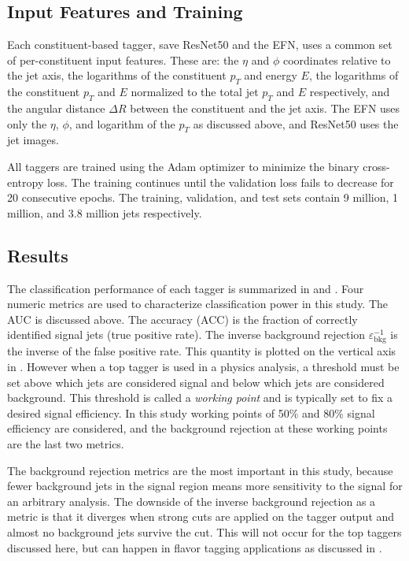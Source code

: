 \subsection{Input Features and Training}

Each constituent-based tagger, save ResNet50 and the EFN, uses a common set of per-constituent input features.
These are: the $\eta$ and $\phi$ coordinates relative to the jet axis, the logarithms of the constituent $p_T$ and energy $E$, the logarithms of the constituent $p_T$ and $E$ normalized to the total jet $p_T$ and $E$ respectively, and the angular distance $\Delta R$ between the constituent and the jet axis.
The EFN uses only the $\eta$, $\phi$, and logarithm of the $p_T$ as discussed above, and ResNet50 uses the jet images.

All taggers are trained using the Adam optimizer to minimize the binary cross-entropy loss.
The training continues until the validation loss fails to decrease for 20 consecutive epochs.
The training, validation, and test sets contain 9 million, 1 million, and 3.8 million jets respectively.

\subsection{Results}

The classification performance of each tagger is summarized in  and .
Four numeric metrics are used to characterize classification power in this study.
The AUC is discussed above.
The accuracy (ACC) is the fraction of correctly identified signal jets (true positive rate).
The inverse background rejection $\varepsilon^{-1}_\text{bkg}$ is the inverse of the false positive rate.
This quantity is plotted on the vertical axis in .
However when a top tagger is used in a physics analysis, a threshold must be set above which jets are considered signal and below which jets are considered background.
This threshold is called a \textit{working point} and is typically set to fix a desired signal efficiency.
In this study working points of 50\% and 80\% signal efficiency are considered, and the background rejection at these working points are the last two metrics.

The background rejection metrics are the most important in this study, because fewer background jets in the signal region means more sensitivity to the signal for an arbitrary analysis.
The downside of the inverse background rejection as a metric is that it diverges when strong cuts are applied on the tagger output and almost no background jets survive the cut.
This will not occur for the top taggers discussed here, but can happen in flavor tagging applications as discussed in .

